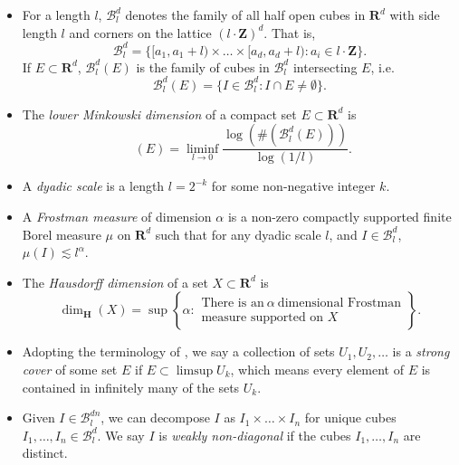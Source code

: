 \documentclass[usenames,dvipsnames]{article}
\theoremstyle{plain}
\theoremstyle{plain}
\DeclareMathOperator{\lhdim}{\underline{\dim}_{\mathbf{M}}}
\begin{document}
\begin{itemize}
	\item For a length $l$, $\mathcal{B}^d_l$ denotes the family of all half open cubes in $\mathbf{R}^d$ with side length $l$ and corners on the lattice $(l \cdot \mathbf{Z})^d$. That is,
	\[ \mathcal{B}^d_l = \{ [a_1,a_1 + l) \times \dots \times [a_d, a_d + l) : a_i \in l \cdot \mathbf{Z} \}. \]
	If $E \subset \mathbf{R}^d$, $\mathcal{B}^d_l(E)$ is the family of cubes in $\mathcal{B}^d_l$ intersecting $E$, i.e.
	\[\mathcal{B}^d_l(E) = \{ I \in \mathcal{B}^d_l: I \cap E \neq \emptyset \}. \]

	\item The {\it lower Minkowski dimension} of a compact set $E \subset \mathbf{R}^d$ is
	\[ \lhdim(E) = \liminf_{l \to 0} \frac{\log( \#( \mathcal{B}^d_l(E) ) )}{\log(1/l)}. \]

	\item A {\it dyadic scale} is a length $l = 2^{-k}$ for some non-negative integer $k$.

	\item A {\it Frostman measure} of dimension $\alpha$ is a non-zero compactly supported finite Borel measure $\mu$ on $\mathbf{R}^d$ such that for any dyadic scale $l$, and $I \in \mathcal{B}^d_l$, $\mu(I) \lesssim l^\alpha$.

	\item The {\it Hausdorff dimension} of a set $X \subset \mathbf{R}^d$ is
	\[ \dim_{\mathbf{H}}(X) = \sup \left\{ \alpha: \begin{array}{c} \text{There is an}\ \alpha\ \text{dimensional Frostman}\\
	\text{measure supported on $X$} \end{array} \right\}. \]

	\item Adopting the terminology of \cite{KatzTao}, we say a collection of sets $U_1, U_2, \dots$ is a {\it strong cover} of some set $E$ if $E \subset \limsup U_k$, which means every element of $E$ is contained in infinitely many of the sets $U_k$.

	\item Given $I \in \mathcal{B}^{dn}_l$, we can decompose $I$ as $I_1 \times \dots \times I_n$ for unique cubes $I_1, \dots, I_n \in \mathcal{B}^d_l$. We say $I$ is {\it weakly non-diagonal} if the cubes $I_1, \dots, I_n$ are distinct.
\end{itemize}
\end{document}
